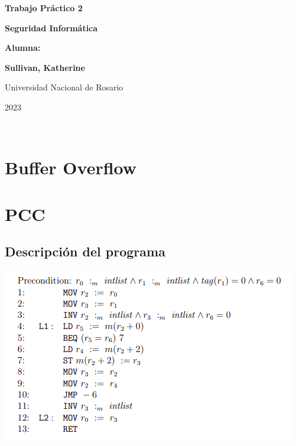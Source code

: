 \documentclass[11pt]{article}
\begin{document}
\begin{titlepage}
    \begin{center}
        \vfill
        \vfill
            \vspace{0.7cm}
            \noindent\textbf{\Huge Trabajo Práctico 2}\par
            \noindent\textbf{\Huge Seguridad Informática}\par
            \vspace{.5cm}
        \vfill
        \noindent \textbf{\huge Alumna:}\par
        \vspace{.5cm}
        \noindent \textbf{\Large Sullivan, Katherine}\par
 
        \vfill
        \large Universidad Nacional de Rosario \par
        \noindent\large 2023
    \end{center}
\end{titlepage}
\ \par



\section{Buffer Overflow}

\section{PCC}

\subsection{Descripción del programa}

\begin{center}
\includegraphics[scale=0.7]{progPCC.png}
\end{center}
\end{document}
